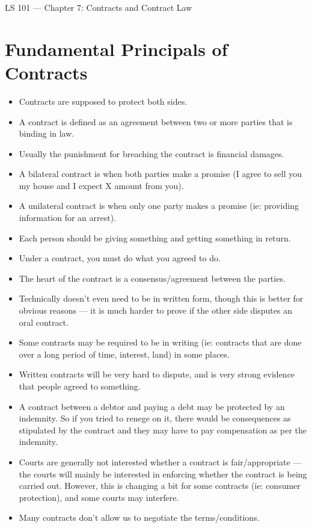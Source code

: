 \documentclass{article}
\author{Clement Tsang}
\begin{document}
\begin{center}
    \Large{LS 101 --- Chapter 7: Contracts and Contract Law} 
\end{center}

\section{Fundamental Principals of Contracts}
\begin{itemize}
    \item Contracts are supposed to protect both sides.
    \item A contract is defined as an agreement between two or more parties that is binding in law.
    \item Usually the punishment for breaching the contract is financial damages.
    \item A bilateral contract is when both parties make a promise (I agree to sell you my house and I expect X amount from you).
    \item A unilateral contract is when only one party makes a promise (ie: providing information for an arrest).
    \item Each person should be giving something and getting something in return.
    \item Under a contract, you must do what you agreed to do.
    \item The heart of the contract is a consensus/agreement between the parties.
    \item Technically doesn't even need to be in written form, though this is better for obvious reasons --- it is much harder to prove if the other side disputes an oral contract.
    \item Some contracts may be required to be in writing (ie: contracts that are done over a long period of time, interest, land) in some places.
    \item Written contracts will be very hard to dispute, and is very strong evidence that people agreed to something.
    \item A contract between a debtor and paying a debt may be protected by an indemnity.  So if you tried to renege on it, there would be consequences as stipulated by the contract and they may have to pay compensation as per the indemnity.
    \item Courts are generally not interested whether a contract is fair/appropriate --- the courts will mainly be interested in enforcing whether the contract is being carried out.  However, this is changing a bit for some contracts (ie: consumer protection), and some courts may interfere.
    \item Many contracts don't allow us to negotiate the terms/conditions.
\end{itemize}
\end{document}
